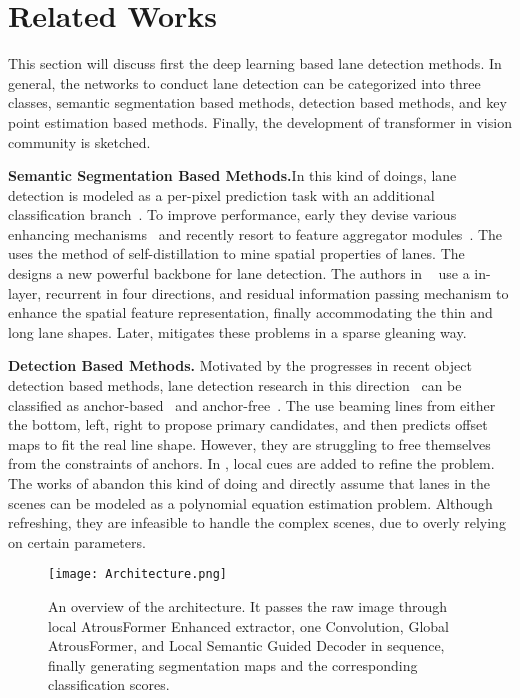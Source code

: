 \documentclass[preprint,12pt,review]{elsarticle}
\begin{document}
\section{Related Works}
\label{sec:relatedWorks}
This section will discuss first the deep learning based lane detection methods. In general, the networks to conduct lane detection can be categorized into three classes, semantic segmentation based methods, detection based methods, and key point estimation based methods. Finally, the development of transformer in vision community is sketched.

\textbf{Semantic Segmentation Based Methods.}In this kind of doings, lane detection is modeled as a per-pixel prediction task with an additional classification branch~\cite{rbnet, erfnet, liulane, SCNN, distillation, vanishing, gan, resa}. To improve performance, early they devise various enhancing mechanisms~\cite{rbnet, erfnet, liulane, gan, distillation} and recently resort to feature aggregator modules~\cite{SCNN, resa}.  The \cite{distillation} uses the method of self-distillation to mine spatial properties of lanes. The \cite{erfnet} designs a new powerful backbone for lane detection. The authors in ~\cite{SCNN} use a in-layer, recurrent in four directions, and residual information passing mechanism to enhance the spatial feature representation, finally accommodating the thin and long lane shapes. Later, \cite{resa} mitigates these problems in a sparse gleaning way.

\textbf{Detection Based Methods.} Motivated by the progresses in recent object detection based methods, lane detection research in this direction~\cite{linecnn,laneatt,polylanenet,lstr} can be classified as anchor-based~\cite{linecnn,laneatt} and anchor-free~\cite{polylanenet,lstr}. The \cite{linecnn, laneatt} use beaming lines from either the bottom, left, right to propose primary candidates, and then predicts offset maps to fit the real line shape. However, they are struggling to free themselves from the constraints of anchors. In \cite{laneatt}, local cues are added to refine the problem. The works of \cite{polylanenet,lstr} abandon this kind of doing and directly assume that lanes in the scenes can be modeled as a polynomial equation estimation problem. Although refreshing, they are infeasible to handle the complex scenes, due to overly relying on certain parameters.

\begin{figure*}[htbp]
	\centering
	\texttt{[image: Architecture.png]}
	\caption{An overview of the architecture. It passes the raw image through local AtrousFormer Enhanced extractor, one  Convolution, Global AtrousFormer, and Local Semantic Guided Decoder in sequence, finally generating segmentation maps and the corresponding classification scores.}
	\label{arch}
\end{figure*}
\end{document}
